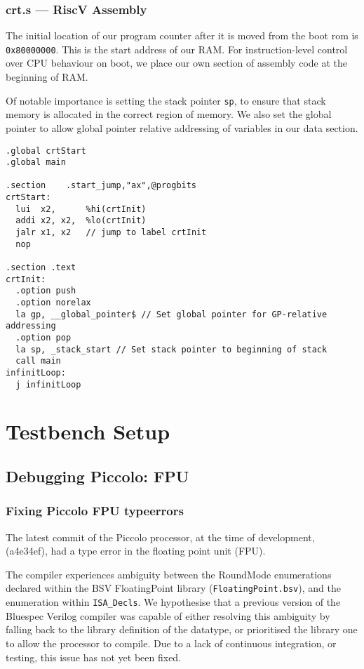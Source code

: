 \documentclass[a4paper,8pt]{report}
\begin{document}
\subsubsection{crt.s --- RiscV Assembly}
The initial location of our program counter after it is moved from the boot rom
is \texttt{0x80000000}. This is the start address of our RAM. For
instruction-level control over CPU behaviour on boot, we place our own section
of assembly code at the beginning of RAM.

Of notable importance is setting the stack pointer \texttt{sp}, to ensure that
stack memory is allocated in the correct region of memory. We also set the
global pointer to allow global pointer relative addressing of variables in our
data section.


\lstset{language=[RISC-V]Assembler, style=customrv}
\begin{lstlisting}
.global crtStart
.global main

.section	.start_jump,"ax",@progbits
crtStart:
  lui  x2,      %hi(crtInit)
  addi x2, x2,  %lo(crtInit)
  jalr x1, x2   // jump to label crtInit
  nop

.section .text
crtInit:
  .option push
  .option norelax
  la gp, __global_pointer$ // Set global pointer for GP-relative addressing
  .option pop
  la sp, _stack_start // Set stack pointer to beginning of stack
  call main
infinitLoop:
  j infinitLoop

\end{lstlisting}
\lstset{}

\section{Testbench Setup}
\subsection{Debugging Piccolo: FPU}
\subsubsection{Fixing Piccolo FPU typeerrors}
The latest commit of the Piccolo processor, at the time of development, (a4e34ef), had
a type error in the floating point unit (FPU). 

The compiler experiences ambiguity between the RoundMode enumerations declared
within the BSV FloatingPoint library (\texttt{FloatingPoint.bsv}), and the
enumeration within \texttt{ISA\_Decls}. We hypothesise that a previous version
of the Bluespec Verilog compiler was capable of either resolving this ambiguity
by falling back to the library definition of the datatype, or prioritised the
library one to allow the processor to compile. Due to a lack of continuous
integration, or testing, this issue has not yet been fixed.
\end{document}
